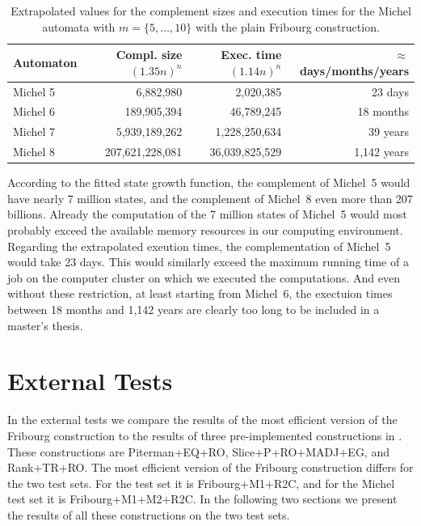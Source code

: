\begin{table}[htb]
\centering
\begin{tabular}{lrrr}
\hline
Automaton & Compl. size $(1.35n)^n$ & Exec. time $(1.14n)^n$ & $\approx$ days/months/years \\
\hline
Michel 5 &       6,882,980 &      2,020,385 &     23 days \\
Michel 6 &     189,905,394 &     46,789,245 &     18 months \\
Michel 7 &   5,939,189,262 &  1,228,250,634 &     39 years \\
Michel 8 & 207,621,228,081 & 36,039,825,529 &  1,142 years \\
\hline
\end{tabular}
\caption{Extrapolated values for the complement sizes and execution times for the Michel automata with $m=\{5,\dots,10\}$ with the plain Fribourg construction.}
\label{i.m.extrapolation}
\end{table}

According to the fitted state growth function, the complement of Michel~5 would have nearly 7 million states, and the complement of Michel~8 even more than 207 billions. Already the computation of the 7 million states of Michel~5 would most probably exceed the available memory resources in our computing environment. Regarding the extrapolated exeution times, the complementation of Michel~5 would take 23 days. This would similarly exceed the maximum running time of a job on the computer cluster on which we executed the computations. And even without these restriction, at least starting from Michel~6, the exectuion times between 18 months and 1,142 years are clearly too long to be included in a master's thesis.




\section{External Tests}
\label{5_external}
In the external tests we compare the results of the most efficient version of the Fribourg construction to the results of three pre-implemented constructions in \goal. These constructions are Piterman+EQ+RO, Slice+P+RO+MADJ+EG, and Rank+TR+RO. The most efficient version of the Fribourg construction differs for the two test sets. For the \goal{} test set it is Fribourg+M1+R2C, and for the Michel test set it is Fribourg+M1+M2+R2C. In the following two sections we present the results of all these constructions on the two test sets.


